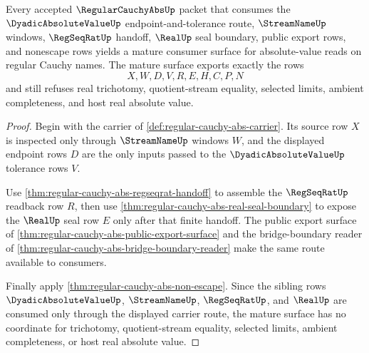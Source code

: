 \begin{theorem}
\label{thm:regular-cauchy-abs-mature-treatment}
Every accepted $\RegularCauchyAbsUp$ packet that consumes the $\DyadicAbsoluteValueUp$ endpoint-and-tolerance route, $\StreamNameUp$ windows, $\RegSeqRatUp$ handoff, $\RealUp$ seal boundary, public export rows, and nonescape rows yields a mature consumer surface for absolute-value reads on regular Cauchy names. The mature surface exports exactly the rows
$$
X,W,D,V,R,E,H,C,P,N
$$
and still refuses real trichotomy, quotient-stream equality, selected limits, ambient completeness, and host real absolute value.
\end{theorem}
\begin{proof}
Begin with the carrier of \autoref{def:regular-cauchy-abs-carrier}. Its source row $X$ is inspected only through $\StreamNameUp$ windows $W$, and the displayed endpoint rows $D$ are the only inputs passed to the $\DyadicAbsoluteValueUp$ tolerance rows $V$.

Use \autoref{thm:regular-cauchy-abs-regseqrat-handoff} to assemble the $\RegSeqRatUp$ readback row $R$, then use \autoref{thm:regular-cauchy-abs-real-seal-boundary} to expose the $\RealUp$ seal row $E$ only after that finite handoff. The public export surface of \autoref{thm:regular-cauchy-abs-public-export-surface} and the bridge-boundary reader of \autoref{thm:regular-cauchy-abs-bridge-boundary-reader} make the same route available to consumers.

Finally apply \autoref{thm:regular-cauchy-abs-non-escape}. Since the sibling rows $\DyadicAbsoluteValueUp$, $\StreamNameUp$, $\RegSeqRatUp$, and $\RealUp$ are consumed only through the displayed carrier route, the mature surface has no coordinate for trichotomy, quotient-stream equality, selected limits, ambient completeness, or host real absolute value.
\end{proof}

